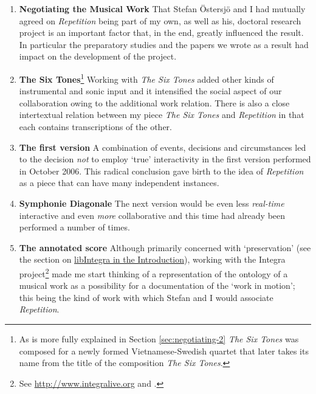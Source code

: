 \begin{enumerate}[(1)]
\item \textbf{Negotiating the Musical Work} That Stefan \"{O}stersj\"{o} and I had mutually agreed on \emph{Repetition} being part of my own, as well as his, doctoral research project is an important factor that, in the end, greatly influenced the result. In particular the preparatory studies and the papers we wrote as a result had impact on the development of the project.%
%
\item \textbf{The Six Tones}\footnote{As is more fully explained in Section \ref{sec:negotiating-2} \emph{The Six Tones} was composed for a newly formed Vietnamese-Swedish quartet that later takes its name from the title of the composition \emph{The Six Tones}.} Working with \emph{The Six Tones} added other kinds of instrumental and sonic input and it intensified the social aspect of our collaboration owing to the additional work relation. There is also a close intertextual relation between my piece \emph{The Six Tones} and  \emph{Repetition} in that each contains transcriptions of the other. %
%
\item \textbf{The first version} A combination of events, decisions and circumstances led to the decision \emph{not} to employ `true' interactivity in the first version performed in October 2006. This radical conclusion gave birth to the idea of \emph{Repetition} as a piece that can have many independent instances.%
%
\item \textbf{Symphonie Diagonale} The next version would be even less \emph{real-time} interactive and even \emph{more} collaborative and this time had already been performed a number of times. %
%
\item \textbf{The annotated score} Although primarily concerned with `preservation' (see the section on \hyperlink{sec:target:libintegra-1}{libIntegra in the Introduction}), working with the Integra project\footnote{See \url{http://www.integralive.org} and \cite{frisk-bull07,frisk-bullock08}.} made me start thinking of a representation of the ontology of a musical work as a possibility for a documentation of the `work in motion'; this being the kind of work with which Stefan and I would associate \emph{Repetition}.%
\end{enumerate}

